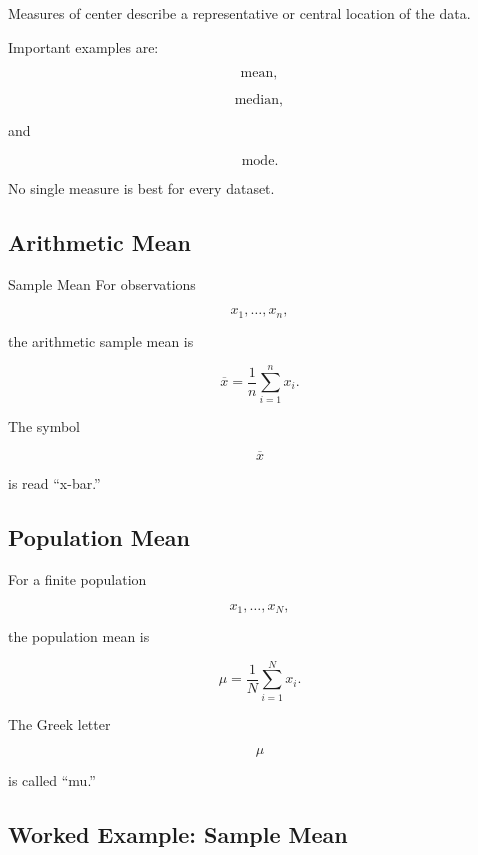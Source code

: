 Measures of center describe a representative or central location of the
data.

Important examples are:

\[
\boxed{
\text{mean},
}
\]

\[
\boxed{
\text{median},
}
\]

and

\[
\boxed{
\text{mode}.
}
\]

No single measure is best for every dataset.

\subsection{Arithmetic Mean}
\label{subsec:arithmetic-mean}

\begin{definitionbox}{Sample Mean}
For observations

\[
x_1,\ldots,x_n,
\]

the arithmetic sample mean is

\[
\boxed{
\overline{x}
=
\frac1n
\sum_{i=1}^{n}x_i.
}
\]
\end{definitionbox}

The symbol

\[
\overline{x}
\]

is read ``x-bar.''

\subsection{Population Mean}
\label{subsec:population-mean}

For a finite population

\[
x_1,\ldots,x_N,
\]

the population mean is

\[
\boxed{
\mu
=
\frac1N
\sum_{i=1}^{N}x_i.
}
\]

The Greek letter

\[
\mu
\]

is called ``mu.''

\subsection{Worked Example: Sample Mean}
\label{subsec:worked-sample-mean}

